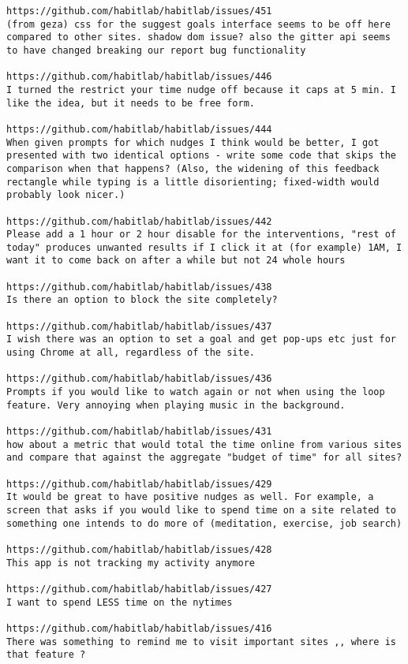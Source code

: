 \begin{lstlisting}[breaklines]
https://github.com/habitlab/habitlab/issues/451
(from geza) css for the suggest goals interface seems to be off here compared to other sites. shadow dom issue? also the gitter api seems to have changed breaking our report bug functionality

https://github.com/habitlab/habitlab/issues/446
I turned the restrict your time nudge off because it caps at 5 min. I like the idea, but it needs to be free form.

https://github.com/habitlab/habitlab/issues/444
When given prompts for which nudges I think would be better, I got presented with two identical options - write some code that skips the comparison when that happens? (Also, the widening of this feedback rectangle while typing is a little disorienting; fixed-width would probably look nicer.)

https://github.com/habitlab/habitlab/issues/442
Please add a 1 hour or 2 hour disable for the interventions, "rest of today" produces unwanted results if I click it at (for example) 1AM, I want it to come back on after a while but not 24 whole hours

https://github.com/habitlab/habitlab/issues/438
Is there an option to block the site completely?

https://github.com/habitlab/habitlab/issues/437
I wish there was an option to set a goal and get pop-ups etc just for using Chrome at all, regardless of the site.

https://github.com/habitlab/habitlab/issues/436
Prompts if you would like to watch again or not when using the loop feature. Very annoying when playing music in the background.

https://github.com/habitlab/habitlab/issues/431
how about a metric that would total the time online from various sites and compare that against the aggregate "budget of time" for all sites?

https://github.com/habitlab/habitlab/issues/429
It would be great to have positive nudges as well. For example, a screen that asks if you would like to spend time on a site related to something one intends to do more of (meditation, exercise, job search)

https://github.com/habitlab/habitlab/issues/428
This app is not tracking my activity anymore

https://github.com/habitlab/habitlab/issues/427
I want to spend LESS time on the nytimes

https://github.com/habitlab/habitlab/issues/416
There was something to remind me to visit important sites ,, where is that feature ?


\end{lstlisting}
